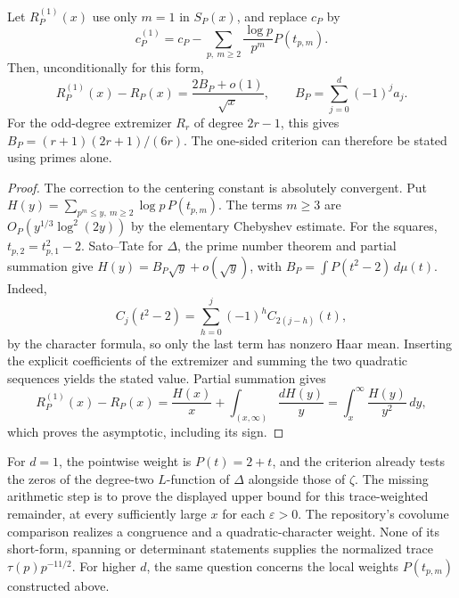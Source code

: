 \begin{proposition}
Let $R_P^{(1)}(x)$ use only $m=1$ in $S_P(x)$, and replace $c_P$ by
\[
 c_P^{(1)}=c_P-\sum_{p,\ m\ge2}\frac{\log p}{p^m}P(t_{p,m}).
\]
Then, unconditionally for this form,
\[
 R_P^{(1)}(x)-R_P(x)=\frac{2B_P+o(1)}{\sqrt{x}},
 \qquad B_P=\sum_{j=0}^{d}(-1)^j a_j.
\]
For the odd-degree extremizer $R_r$ of degree $2r-1$, this gives
$B_P=(r+1)(2r+1)/(6r)$. The one-sided criterion can therefore be stated using primes alone.
\end{proposition}
\begin{proof}
The correction to the centering constant is absolutely convergent. Put
$H(y)=\sum_{p^m\le y,\ m\ge2}\log p\,P(t_{p,m})$.
The terms $m\ge3$ are $O_P(y^{1/3}\log^2(2y))$ by the elementary Chebyshev estimate. For the squares, $t_{p,2}=t_{p,1}^2-2$. Sato--Tate for $\Delta$, the prime number theorem and partial summation give $H(y)=B_P\sqrt y+o(\sqrt y)$, with $B_P=\int P(t^2-2)\,d\mu(t)$. Indeed,
\[
 C_j(t^2-2)=\sum_{h=0}^j(-1)^h C_{2(j-h)}(t),
\]
by the character formula, so only the last term has nonzero Haar mean. Inserting the explicit coefficients of the extremizer and summing the two quadratic sequences yields the stated value. Partial summation gives
\[
 R_P^{(1)}(x)-R_P(x)=\frac{H(x)}{x}+\int_{(x,\infty)}\frac{dH(y)}{y}
   =\int_x^\infty\frac{H(y)}{y^2}\,dy,
\]
which proves the asymptotic, including its sign.
\end{proof}

For $d=1$, the pointwise weight is $P(t)=2+t$, and the criterion already tests the zeros of the degree-two $L$-function of $\Delta$ alongside those of $\zeta$. The missing arithmetic step is to prove the displayed upper bound for this trace-weighted remainder, at every sufficiently large $x$ for each $\varepsilon>0$. The repository's covolume comparison realizes a congruence and a quadratic-character weight. None of its short-form, spanning or determinant statements supplies the normalized trace $\tau(p)p^{-11/2}$. For higher $d$, the same question concerns the local weights $P(t_{p,m})$ constructed above.
